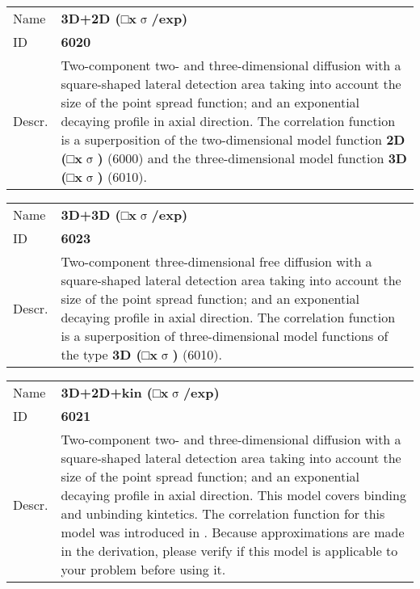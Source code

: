 \noindent \begin{tabular}{lp{}}
Name & \textbf{3D+2D (□x$\upsigma$/exp)} \\ 
ID & \textbf{6020} \\ 
Descr. &  Two-component two- and three-dimensional diffusion with a square-shaped lateral detection area taking into account the size of the point spread function; and an exponential decaying profile in axial direction.  \newline
The correlation function is a superposition of the two-dimensional model function \textbf{2D (□x$\upsigma$)} (6000) and the three-dimensional model function \textbf{3D (□x$\upsigma$)} (6010).
\end{tabular}
\vspace{2em}


\noindent \begin{tabular}{lp{}}
Name & \textbf{3D+3D (□x$\upsigma$/exp)} \\ 
ID & \textbf{6023} \\ 
Descr. &  Two-component three-dimensional free diffusion with a square-shaped lateral detection area taking into account the size of the point spread function; and an exponential decaying profile in axial direction. \newline
The correlation function is a superposition of three-dimensional model functions of the type \textbf{3D (□x$\upsigma$)} (6010). \\
\end{tabular}
\vspace{2em}


\noindent \begin{tabular}{lp{}}
Name & \textbf{3D+2D+kin (□x$\upsigma$/exp)} \\ 
ID & \textbf{6021} \\ 
Descr. &  Two-component two- and three-dimensional diffusion with a square-shaped lateral detection area taking into account the size of the point spread function; and an exponential decaying profile in axial direction. This model covers binding and unbinding kintetics.  \newline 
The correlation function for this model was introduced in \cite{Ries2008390}. Because approximations are made in the derivation, please verify if this model is applicable to your problem before using it.
\end{tabular}
\vspace{2em}


